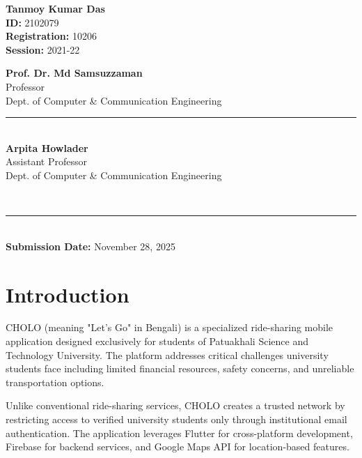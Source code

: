 \documentclass[12pt,a4paper]{article}
\begin{document}
\begin{titlepage}
{{        %
        \begin{minipage}[t]{0.45\textwidth}
            \centering
            \textbf{\large Tanmoy Kumar Das}\\[0.2cm]
            \textbf{ID:} 2102079\\
            \textbf{Registration:} 10206\\
            \textbf{Session:} 2021-22
        \end{minipage}
        \hfill
        \begin{minipage}[t]{0.45\textwidth}
            \centering
            \textbf{Prof. Dr. Md Samsuzzaman}\\
            Professor\\
            Dept. of Computer \& Communication Engineering\\[0.25cm]
            {\color{gray}\rule{0.85\textwidth}{0.4pt}}\\[0.25cm]
            \textbf{Arpita Howlader}\\
            Assistant Professor\\
            Dept. of Computer \& Communication Engineering
        \end{minipage}

        \vspace{0.3cm}
    }}\\[0.1cm]
    \rule{0.95\textwidth}{0.5pt}\\[0.5cm]
    
    {\large \textbf{Submission Date:} November 28, 2025}
    
\end{titlepage}

\tableofcontents
\newpage

\section{Introduction}

CHOLO (meaning "Let's Go" in Bengali) is a specialized ride-sharing mobile application designed exclusively for students of Patuakhali Science and Technology University. The platform addresses critical challenges university students face including limited financial resources, safety concerns, and unreliable transportation options.

Unlike conventional ride-sharing services, CHOLO creates a trusted network by restricting access to verified university students only through institutional email authentication. The application leverages Flutter for cross-platform development, Firebase for backend services, and Google Maps API for location-based features.
\end{document}
